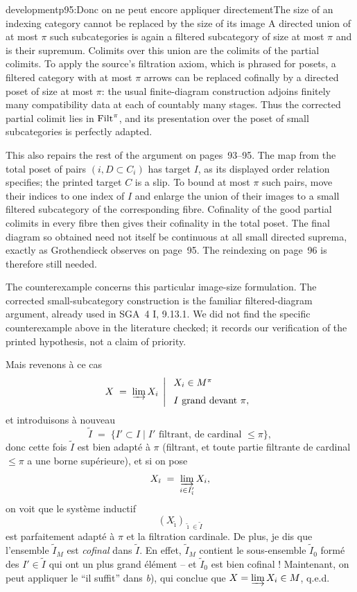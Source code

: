 \begin{dcomment}{development}{p95:Donc on ne peut encore appliquer directement}{The size of an indexing category cannot be replaced by the size of its image}
A directed union of at most $\pi$ such subcategories is again a filtered subcategory of size at most $\pi$ and is their supremum. Colimits over this union are the colimits of the partial colimits. To apply the source's filtration axiom, which is phrased for posets, a filtered category with at most $\pi$ arrows can be replaced cofinally by a directed poset of size at most $\pi$: the usual finite-diagram construction adjoins finitely many compatibility data at each of countably many stages. Thus the corrected partial colimit lies in $\mathrm{Filt}^\pi$, and its presentation over the poset of small subcategories is perfectly adapted.

This also repairs the rest of the argument on pages~93--95. The map from the total poset of pairs $(i,D\subset C_i)$ has target $I$, as its displayed order relation specifies; the printed target $C$ is a slip. To bound at most $\pi$ such pairs, move their indices to one index of $I$ and enlarge the union of their images to a small filtered subcategory of the corresponding fibre. Cofinality of the good partial colimits in every fibre then gives their cofinality in the total poset. The final diagram so obtained need not itself be continuous at all small directed suprema, exactly as Grothendieck observes on page~95. The reindexing on page~96 is therefore still needed.

The counterexample concerns this particular image-size formulation. The corrected small-subcategory construction is the familiar filtered-diagram argument, already used in SGA~4 I, 9.13.1. We did not find the specific counterexample above in the literature checked; it records our verification of the printed hypothesis, not a claim of priority.
\end{dcomment}


Mais revenons à ce cas
\[ X \;=\; \varinjlim X_i \;\left|\; \begin{array}{l} X_i\in M^\pi \\[1.5ex] I \text{ grand devant } \pi, \end{array}\right. \]
et introduisons à nouveau
\[ \tilde{I} \;=\; \{I'\subset I \mid I' \text{ filtrant, de cardinal } \le\pi\}, \]
donc cette fois $\tilde{I}$ est bien adapté à $\pi$ (filtrant, et toute partie filtrante de cardinal $\le\pi$ a une borne supérieure), et si on pose
\[ X_{\tilde{\imath}} \;=\; \varinjlim_{i\in I'_{\tilde{\imath}}} X_i, \]
on voit que le système inductif
\[ (X_{\tilde{\imath}})_{\tilde{\imath}\in\tilde{I}} \]
est parfaitement adapté à $\pi$ et la filtration cardinale. De plus, je dis que l'ensemble $\tilde{I}_M$ est \textit{cofinal} dans $\tilde{I}$. En effet, $\tilde{I}_M$ contient le sous-ensemble $\tilde{I}_0$ formé des $I'\in\tilde{I}$ qui ont un plus grand élément -- et $\tilde{I}_0$ est bien cofinal ! Maintenant, on peut appliquer
le ``il suffit'' dans \textit{b}), qui conclue que $X = \varinjlim X_i\in M$, q.e.d. %

